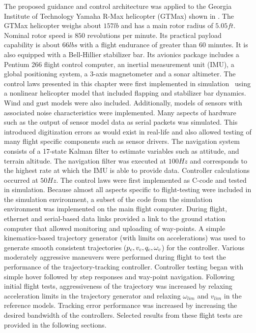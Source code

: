 The proposed guidance and control architecture was applied to the
Georgia Institute of Technology Yamaha R-Max helicopter (GTMax)
shown in . The GTMax helicopter weighs about $157 lb$
and has a main rotor radius of $5.05 ft$. Nominal rotor speed is
$850$ revolutions per minute. Its practical payload capability is
about $66 lbs$ with a flight endurance of greater than 60 minutes.
It is also equipped with a Bell-Hillier stabilizer bar. Its avionics
package includes a Pentium 266 flight control computer, an inertial
measurement unit (IMU), a global positioning system, a 3-axis
magnetometer and a sonar altimeter. The control laws presented in
this chapter were first implemented in
simulation~\cite{kannan:mst:2004} using a nonlinear helicopter model
that included flapping and stabilizer bar dynamics. Wind and gust
models were also included. Additionally, models of sensors with
associated noise characteristics were implemented. Many aspects of
hardware such as the output of sensor model data as serial packets
was simulated. This introduced digitization errors as would exist in
real-life and also allowed testing of many flight specific
components such as sensor drivers. The
navigation system~\cite{henrik:jacic:2006} consists of a 17-state Kalman filter to estimate
variables such as attitude, and terrain altitude. The navigation
filter was executed at $100 Hz$ and corresponds to the highest rate
at which the IMU is able to provide data. Controller calculations
occurred at $50 Hz$. The control laws were first implemented as
C-code and tested in simulation. Because almost all aspects specific
to flight-testing were included in the simulation environment, a
subset of the code from the simulation environment was implemented
on the main flight computer. During flight, ethernet and
serial-based data links provided a link to the ground station
computer that allowed monitoring and uploading of way-points. A
simple kinematics-based trajectory generator (with limits on
accelerations) was used to generate smooth consistent trajectories
($p_c,v_c,q_c,\omega_c$) for the controller. Various moderately
aggressive maneuvers were performed during flight to test the
performance of the trajectory-tracking controller. Controller
testing began with simple hover followed by step responses and
way-point navigation. Following initial flight tests, aggressiveness
of the trajectory was increased by relaxing acceleration limits in
the trajectory generator and relaxing $\omega_{lim}$ and $v_{lim}$
in the reference models. Tracking error performance was increased by
increasing the desired bandwidth of the controllers. Selected
results from these flight tests are provided in the following
sections.

